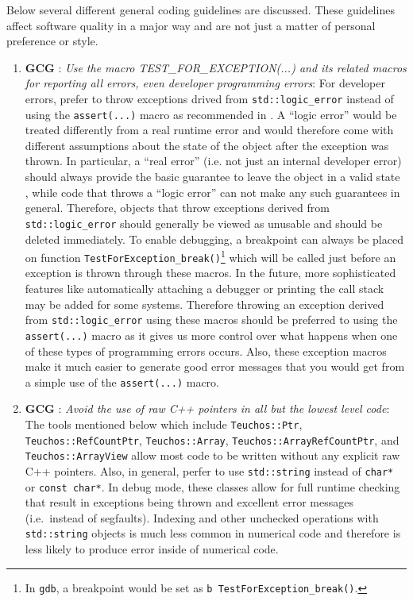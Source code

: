 Below several different general coding guidelines are discussed.  These
guidelines affect software quality in a major way and are not just a matter of
personal preference or style.

\begin{enumerate}

{}\item{}\textbf{GCG }:
{}\textit{Use the macro TEST\-\_FOR\-\_EXCEPTION(...) and its related
macros for reporting all errors, even developer programming errors}: For
developer errors, prefer to throw exceptions drived from
{}\texttt{std\-::logic\-\_error} instead of using the {}\texttt{assert(...)}
macro as recommended in {}\cite[Item 68]{C++CodingStandards05}.  A ``logic
error'' would be treated differently from a real runtime error and would
therefore come with different assumptions about the state of the object after
the exception was thrown.  In particular, a ``real error'' (i.e. not just an
internal developer error) should always provide the basic guarantee to leave
the object in a valid state {}\cite[Item 71]{C++CodingStandards05}, while code
that throws a ``logic error'' can not make any such guarantees in general.
Therefore, objects that throw exceptions derived from
{}\texttt{std\-::logic\-\_error} should generally be viewed as unusable and
should be deleted immediately.  To enable debugging, a breakpoint can always
be placed on function {}\texttt{Test\-For\-Exception\-\_break()}\footnote{In
{}\texttt{gdb}, a breakpoint would be set as {}\texttt{b
Test\-For\-Exception\-\_break()}.} which will be called just before an
exception is thrown through these macros.  In the future, more sophisticated
features like automatically attaching a debugger or printing the call stack
may be added for some systems.  Therefore throwing an exception derived from
{}\texttt{std\-::logic\-\_error} using these macros should be preferred to
using the {}\texttt{assert(...)} macro as it gives us more control over what
happens when one of these types of programming errors occurs.  Also, these
exception macros make it much easier to generate good error messages that you
would get from a simple use of the {}\texttt{assert(...)} macro.

{}\item{}\textbf{GCG }:
{}\textit{Avoid the use of raw C++ pointers in all but the lowest level
code}: The tools mentioned below which include {}\texttt{Teuchos::\-Ptr},
{}\texttt{Teuchos::\-Ref\-Count\-Ptr}, {}\texttt{Teuchos::\-Array},
{}\texttt{Teuchos::\-Array\-Ref\-Count\-Ptr}, and
{}\texttt{Teuchos::\-Array\-View} allow most code to be written without any
explicit raw C++ pointers.  Also, in general, perfer to use
{}\texttt{std\-::string} instead of {}\texttt{char*} or {}\texttt{const
char*}.  In debug mode, these classes allow for full runtime checking that
result in exceptions being thrown and excellent error messages (i.e.\ instead
of segfaults).  Indexing and other unchecked operations with
{}\texttt{std\-::string} objects is much less common in numerical code and
therefore is less likely to produce error inside of numerical code.


\end{enumerate}
